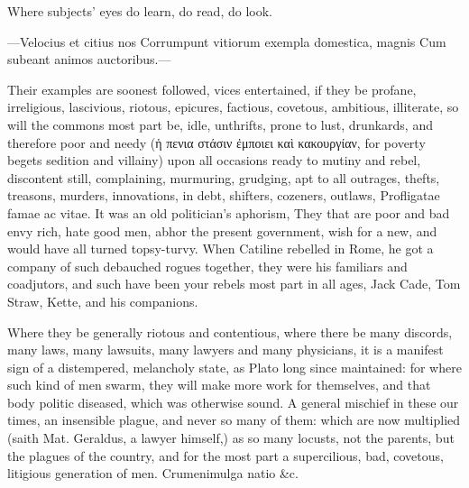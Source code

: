 {Where subjects' eyes do learn, do read, do look.

---Velocius et citius nos
Corrumpunt vitiorum exempla domestica, magnis
Cum subeant animos auctoribus.---

Their examples are soonest followed, vices entertained, if they be
profane, irreligious, lascivious, riotous, epicures, factious,
covetous, ambitious, illiterate, so will the commons most part be,
idle, unthrifts, prone to lust, drunkards, and therefore poor and needy
(ἡ πενια στάσιν ἐμποιει καὶ κακουργίαν, for poverty begets sedition and
villainy) upon all occasions ready to mutiny and rebel, discontent
still, complaining, murmuring, grudging, apt to all outrages, thefts,
treasons, murders, innovations, in debt, shifters, cozeners, outlaws,
Profligatae famae ac vitae. It was an old politician's aphorism,
They that are poor and bad envy rich, hate good men, abhor the present
government, wish for a new, and would have all turned topsy-turvy. When
Catiline rebelled in Rome, he got a company of such debauched rogues
together, they were his familiars and coadjutors, and such have been
your rebels most part in all ages, Jack Cade, Tom Straw, Kette, and his
companions.

Where they be generally riotous and contentious, where there be many
discords, many laws, many lawsuits, many lawyers and many physicians,
it is a manifest sign of a distempered, melancholy state, as Plato
long since maintained: for where such kind of men swarm, they will make
more work for themselves, and that body politic diseased, which was
otherwise sound. A general mischief in these our times, an insensible
plague, and never so many of them: which are now multiplied (saith Mat.
Geraldus, a lawyer himself,) as so many locusts, not the parents,
but the plagues of the country, and for the most part a supercilious,
bad, covetous, litigious generation of men. Crumenimulga natio \&c.

}
